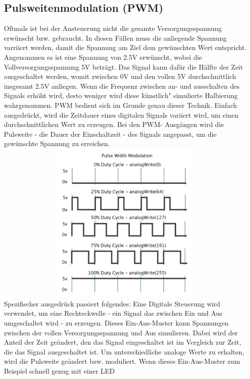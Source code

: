 \subsection{Pulsweitenmodulation (PWM)}\label{PWM}
Oftmals ist bei der Ansteuerung nicht die gesamte Versorgungsspannung erwünscht bzw. gebraucht. In diesen Fällen muss
die anliegende Spannung varriiert werden, damit die Spannung am Ziel dem gewünschten Wert entspricht.
Angenommen es ist eine Spannung von 2.5V erwünscht, wobei die Vollversorgungsspannung 5V beträgt. Das Signal kann
dafür die Hälfte der Zeit ausgeschaltet werden, womit zwischen 0V und den vollen 5V durchschnittlich insgesamt 2.5V
anliegen. Wenn die Frequenz zwischen an- und ausschalten des Signals erhöht wird, desto weniger wird diese \"künstlich"
simulierte Halbierung wahrgenommen. \newline
PWM bedient sich im Grunde genau dieser Technik.
Einfach ausgedrückt, wird die Zeitdauer eines digitalen Signals variiert wird, um einen
durchschnittlichen Wert zu erzeugen. Bei den PWM- Ausgängen wird die Pulsweite - die Dauer der Einschaltzeit -
des Signals angepasst, um die gewünschte Spannung zu erreichen. \newline
\includegraphics [width=13cm, height=8cm] {img/pulsweite} \newline \newline
Spezifischer ausgedrück passiert folgendes:
Eine Digitale Steuerung wird verwendet, um eine Rechteckwelle - ein Signal das zwischen Ein und Aus umgeschaltet wird
- zu erzeugen. Dieses Ein-Aus-Muster kann Spannungen zwischen der vollen Versorgungsspannung und Aus
simulieren.
Dabei wird der Anteil der Zeit geändert, den das Signal eingeschaltet ist im Vergleich zur Zeit, die das Signal
ausgeschaltet ist. Um unterschiedliche analoge Werte zu
erhalten, wird die Pulsweite geändert bzw. moduliert. Wenn dieses Ein-Aus-Muster zum Beispiel schnell genug mit einer LED
